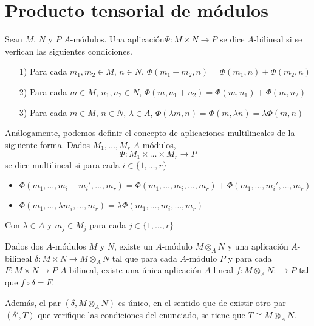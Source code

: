 \documentclass[../main.tex]{subfiles}
\begin{document}
\section{Producto tensorial de módulos}
\begin{definition} Sean $M$, $N$ y $P$ $A$-módulos. Una aplicación$\Phi:M\times N\longrightarrow P$ se dice $A$-bilineal si se verfican las siguientes condiciones.
\begin{itemize}
    \item [1)] Para cada $m_1,m_2\in M$, $n\in N$, $\Phi(m_1+m_2,n)=\Phi(m_1,n)+\Phi(m_2,n)$
    \item [2)] Para cada $m\in M$, $n_1,n_2\in N$, $\Phi(m,n_1+n_2)=\Phi(m,n_1)+\Phi(m,n_2)$
    \item [3)] Para cada $m\in M$, $n\in N$, $\lambda\in A$, $\Phi(\lambda m,n)=\Phi(m,\lambda n)=\lambda\Phi(m,n)$
\end{itemize}
\end{definition}
\begin{remark} Análogamente, podemos definir el concepto de aplicaciones multilineales de la siguiente forma. Dados $M_1,\dots ,M_r$ $A$-módulos,$$\Phi:M_1\times\dots\times M_r\longrightarrow P$$ se dice multilineal si para cada $i\in\{1,\dots,r\}$\begin{itemize}
    \item $\Phi(m_1,\dots,m_i+m_i',\dots,m_r)=\Phi(m_1,\dots,m_i,\dots,m_r)+\Phi(m_1,\dots,m_i',\dots,m_r)$
    \item $\Phi(m_1,\dots,\lambda m_i,\dots,m_r)=\lambda\Phi(m_1,\dots,m_i,\dots,m_r)$
\end{itemize}
Con $\lambda\in A$ y $m_j\in M_j$ para cada $j\in\{1,\dots,r\}$
\end{remark}

\begin{proposition} Dados dos $A$-módulos $M$ y $N$, existe un $A$-módulo $M\otimes_AN$ y una aplicación $A$-bilineal $\delta:M\times N\rightarrow M\otimes_AN$ tal que para cada $A$-módulo $P$ y para cada $F:M\times N\rightarrow P$ $A$-bilineal, existe una única aplicación $A$-lineal $f:M\otimes_AN:\rightarrow P$ tal que $f\circ\delta =F$.

Además, el par $(\delta,M\otimes_AN)$ es único, en el sentido que de existir otro par $(\delta',T)$ que verifique las condiciones del enunciado, se tiene que $T\cong M\otimes_AN$.
\end{proposition}
\end{document}
